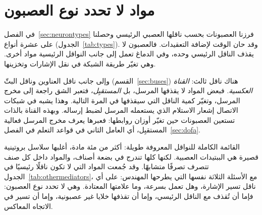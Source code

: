 \chapter{مواد لا تحدد نوع العصبون}
\label{sec:othermediators}

في الفصل~\ref{sec:neurontypes} فرزنا العصبونات بحسب ناقلها العصبي الرئيسي وحصلنا على عشرة أنواع (الجدول~\ref{tab:types}). وقد حان الوقت لإضافة التعقيدات. فالعصبون لا يقذف الناقل الرئيسي وحده، وفي الدماغ تعمل إلى جانب النواقل الرئيسية مواد أخرى. وهي تغيّر طريقة الشبكة في نقل الإشارات وتخزينها.

وإلى جانب ناقل العناوين وناقل البثّ (القسم~\ref{sec:buses}) هناك ناقل ثالث: \emph{القناة العكسية}. فبعض المواد لا يقذفها المرسل، بل \emph{المستقبِل}، فتعبر الشق راجعة إلى مخرج المرسل، وتغيّر كمية الناقل التي سيقذفها في المرة التالية. وهذا يشبه في شبكات الاتصال إشعار الاستلام الذي يستعمله المرسل لضبط إرساله. وبهذه القناة بالذات تستعين العصبونات حين تغيّر أوزان روابطها: فعبرها يعرف مخرج المرسل فعالية المستقبِل، أي العامل الثاني في قواعد التعلم في الفصل~\ref{sec:dofa}.

القائمة الكاملة للنواقل المعروفة طويلة: أكثر من مئة مادة، أغلبها سلاسل بروتينية قصيرة هي الببتيدات العصبية. لكنها كلها تندرج في بضعة أصناف، والمواد داخل كل صنف تتصرف تصرفًا متشابهًا. وقد جُمعت المواد التي لا تكون ناقلًا رئيسيًا في الجدول~\ref{tab:othermediators}، مع الأسئلة الثلاثة نفسها التي يطرحها المهندس: على أي ناقل تسير الإشارة، وهل تعمل بسرعة، وما علامتها المعتادة. وهي لا تحدد نوع العصبون: فإما أن تُقذف مع الناقل الرئيسي، وإما أن تقذفها خلايا غير عصبونية، وإما أن تسير في الاتجاه المعاكس.

